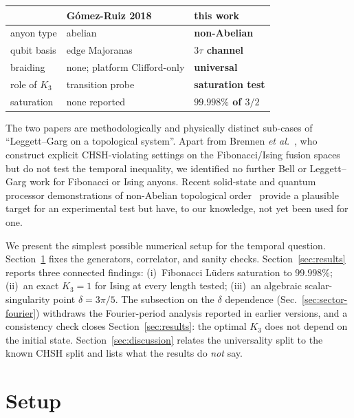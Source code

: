 \documentclass[aps,prx,reprint,amsmath,amssymb,floatfix,nofootinbib,superscriptaddress]{revtex4-2}
\begin{document}
\begin{center}\footnotesize
\setlength{\tabcolsep}{4pt}
\begin{tabular}{lll}
\toprule
                 & G\'omez-Ruiz 2018~\cite{GomezRuiz2018} & this work \\
\midrule
anyon type       & abelian            & \textbf{non-Abelian} \\
qubit basis      & edge Majoranas     & \textbf{$3\tau$ channel} \\
braiding         & none; platform Clifford-only & \textbf{universal} \\
role of $K_{3}$  & transition probe   & \textbf{saturation test} \\
saturation       & none reported      & \textbf{$99.998\%$ of $3/2$} \\
\bottomrule
\end{tabular}
\end{center}

\noindent The two papers are methodologically and physically distinct
sub-cases of ``Leggett--Garg on a topological system''. Apart from Brennen \emph{et al.}~\cite{Brennen2009}, who construct explicit CHSH-violating settings on the Fibonacci/Ising fusion spaces but do not test the temporal inequality, we identified no further Bell or Leggett--Garg work for Fibonacci or Ising anyons. Recent
solid-state and quantum processor demonstrations of non-Abelian
topological order~\cite{Andersen2023,Iqbal2024,Xu2024,Minev2025}
provide a plausible target for an experimental test but have, to our
knowledge, not yet been used for one.

We present the simplest possible numerical setup for the temporal
question. Section~\ref{sec:setup} fixes the generators, correlator,
and sanity checks. Section~\ref{sec:results} reports three connected
findings: (i)~Fibonacci L\"uders saturation to $99.998\%$; (ii)~an exact
$K_{3}=1$ for Ising at every length tested; (iii)~an algebraic
scalar-singularity point $\delta = 3\pi/5$. The subsection on the
$\delta$ dependence (Sec.~\ref{sec:sector-fourier}) withdraws the
Fourier-period analysis reported in earlier versions, and a consistency
check closes Section~\ref{sec:results}: the optimal $K_{3}$ does not
depend on the initial state.
Section~\ref{sec:discussion} relates the universality split to the
known CHSH split and lists what the results do \emph{not} say.

\section{Setup}
\label{sec:setup}
\end{document}
